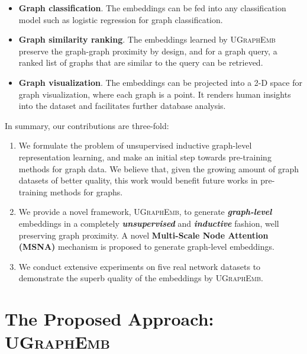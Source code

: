 \documentclass{article}
\newcommand{\model}{\textsc{UGraphEmb}\xspace}
\begin{document}
\begin{itemize}
 \item \textbf{{Graph classification}}. The embeddings can be fed into any classification model such as logistic regression for graph classification.
    \item \textbf{{Graph similarity ranking}}. The embeddings learned by \model preserve the graph-graph proximity by design, and for a graph query, a ranked list of graphs that are similar to the query can be retrieved.
     
     \item \textbf{{Graph visualization}}. The embeddings can be projected into a 2-D space for graph visualization, where each graph is a point. It renders human insights into the dataset and facilitates further database analysis.

    
\end{itemize}







In summary, our contributions are three-fold:
\begin{enumerate}
    \item We formulate the problem of unsupervised inductive graph-level representation learning, and make an initial step towards pre-training methods for graph data. We believe that, given the growing amount of graph datasets of better quality, this work would benefit future works in pre-training methods for graphs.
    \item We provide a novel framework, \model, to generate \textbf{\textit{graph-level}} embeddings in a completely \textbf{\textit{unsupervised}} and \textbf{\textit{inductive}} fashion, well preserving graph proximity. A novel \textbf{Multi-Scale Node Attention (MSNA)} mechanism is proposed to generate graph-level embeddings. 
    \item We conduct extensive experiments on five real network datasets to demonstrate the superb quality of the embeddings by \model.
\end{enumerate}




 \section{The Proposed Approach: \model} 
\end{document}

